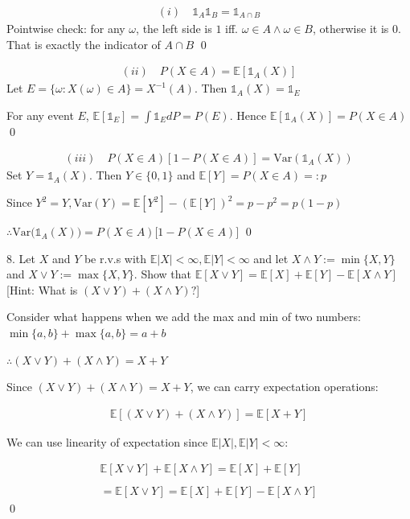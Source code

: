 \documentclass[10pt]{article}
\begin{document}
\begin{gather*}
    (i)\quad\mathbb{1}_A\mathbb{1}_B = \mathbb{1}_{A\cap B}
\end{gather*}
Pointwise check: for any $\omega$, the left side is $1$ iff. $\omega \in A \land \omega \in B$, otherwise it is $0$. That is exactly the indicator 
of $A \cap B$ \qed

\begin{gather*}
    (ii)\quad P(X \in A) = \mathbb{E}[\mathbb{1}_A(X)]
\end{gather*}
Let $E = \{\omega: X(\omega) \in A\} = X^{-1}(A)$. Then $\mathbb{1}_A(X) = \mathbb{1}_E$

For any event $E$, $\mathbb{E}[\mathbb{1}_E] = \int \mathbb{1}_E dP = P(E)$. Hence $\mathbb{E}[\mathbb{1}_A(X)] = P(X \in A)$ \qed

\begin{gather*}
    (iii)\quad P(X \in A)[1 - P(X \in A)] = \text{Var}(\mathbb{1}_A(X))
\end{gather*}
Set $Y = \mathbb{1}_A(X)$. Then $Y \in \{0, 1\}$ and $\mathbb{E}[Y] = P(X \in A) =: p$

Since $Y^2 = Y, \text{Var}(Y) = \mathbb{E}[Y^2] - (\mathbb{E}[Y])^2 = p - p^2 = p(1 - p)$

$\therefore \text{Var}\big(\mathbb{1}_A(X)\big) = P(X \in A)\big[1 - P(X \in A)\big]$ \qed

\newpage

8. Let $X$ and $Y$ be r.v.s with $\mathbb{E}|X| < \infty, \mathbb{E}|Y| < \infty$ and let $X\land Y:= \min \{X, Y\}$ and $X\lor Y := \max \{X, Y\}$. 
Show that $\mathbb{E}[X \lor Y] = \mathbb{E}[X] + \mathbb{E}[Y] - \mathbb{E}[X \land Y]$ [Hint: What is $(X \lor Y) + (X\land Y)?$]

Consider what happens when we add the max and min of two numbers: $\min \{a, b\} + \max \{a, b\} = a + b$

$\therefore(X \lor Y) + (X\land Y) = X + Y$

Since $(X \lor Y) + (X\land Y) = X + Y$, we can carry expectation operations: 

\begin{gather*}
    \mathbb{E}[(X \lor Y) + (X\land Y)] = \mathbb{E}[X + Y]
\end{gather*}

We can use linearity of expectation since $\mathbb{E}|X|, \mathbb{E}|Y| < \infty$:

\begin{gather*}
    \mathbb{E}[X \lor Y] + \mathbb{E}[X \land Y] = \mathbb{E}[X] + \mathbb{E}[Y]\\
    \\
    = \mathbb{E}[X \lor Y] = \mathbb{E}[X] + \mathbb{E}[Y] - \mathbb{E}[X \land Y]
\end{gather*}
\qed
\end{document}

